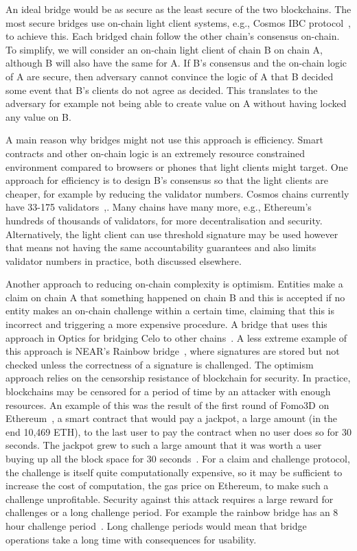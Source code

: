 \noindent An ideal bridge would be as secure as the least secure of the two blockchains. The most secure bridges use on-chain light client systems, e.g., Cosmos IBC protocol~\cite{IBC_paper}, to achieve this. Each bridged chain follow the other chain's consensus on-chain. To simplify, we will consider an on-chain light client of chain B on chain A, although B will also have the same for A. If B's consensus and the on-chain logic of A are secure, then adversary cannot convince the logic of A that B decided some event that B's clients do not agree as decided. This translates to the adversary for example not being able to create value on A without having locked any value on B.

\noindent A main reason why bridges might not use this approach is efficiency. Smart contracts and other on-chain logic is an extremely resource constrained environment compared to browsers or phones that light clients might target. One approach for efficiency is to design B's consensus so that the light clients are cheaper, for example by reducing the validator numbers. Cosmos chains currently have 33-175 validators~\cite{CosmosValNYX},\cite{CosmosValHUB}. Many chains have many more, e.g., Ethereum's hundreds of thousands of validators, for more decentralisation and security. Alternatively, the light client can use threshold signature may be used however that means not having the same accountability guarantees and also limits validator numbers in practice, both discussed elsewhere.


\noindent Another approach to reducing on-chain complexity is optimism. Entities make a claim on chain A that something happened on chain B and this is accepted if no entity makes an on-chain challenge within a certain time, claiming that this is incorrect and triggering a more expensive procedure. A bridge that uses this approach in Optics for bridging Celo to other chains~\cite{CeloOptics}. A less extreme example of this approach is NEAR's Rainbow bridge~\cite{NEARrainbowB}, where signatures are stored but not checked unless the correctness of a signature is challenged. The optimism approach relies on the censorship resistance of blockchain for security. In practice, blockchains may be censored for a period of time by an attacker with enough resources. An example of this was the result of the first round of Fomo3D on Ethereum~\cite{Fomo3DPM}, a smart contract that would pay a jackpot, a large amount (in the end 10,469 ETH), to the last user to pay the contract when no user does so for 30 seconds. The jackpot grew to such a large amount that it was worth a user buying up all the block space for 30 seconds~\cite{Fomo3DPM}. For a claim and challenge protocol, the challenge is itself quite computationally expensive, so it may be sufficient to increase the cost of computation, the gas price on Ethereum, to make such a challenge unprofitable. Security against this attack requires a large reward for challenges or a long challenge period. For example the rainbow bridge has an 8 hour challenge period~\cite{RainbowBridgeFAQ}. Long challenge periods would mean that bridge operations take a long time with consequences for usability.

